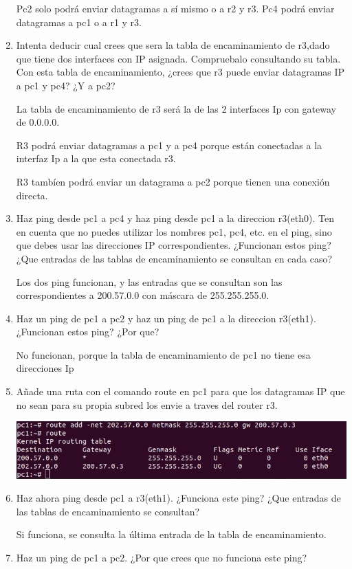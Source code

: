 \documentclass[12pt, a4paper]{report}
\begin{document}
\begin{enumerate}
	Pc2 solo podrá enviar datagramas a sí mismo o a r2 y r3.
	Pc4 podrá enviar datagramas a pc1 o a r1 y r3.

	\item Intenta deducir cual crees que sera la tabla de encaminamiento de r3,dado que tiene dos interfaces con IP asignada. Compruebalo consultando su tabla. Con esta tabla de encaminamiento,  ¿crees que r3 puede enviar datagramas IP a pc1 y pc4? ¿Y a pc2?
	
	La tabla de encaminamiento de r3 será la de las 2 interfaces Ip con gateway de 0.0.0.0.
	
	R3 podrá enviar datagramas a pc1 y a pc4 porque están conectadas a la interfaz Ip a la que esta conectada r3.
	
	R3 tambíen podrá enviar un datagrama a pc2 porque tienen una conexión directa.
	
	\item Haz ping desde pc1 a pc4 y haz ping desde pc1 a la direccion r3(eth0). Ten en cuenta que no puedes utilizar los nombres pc1, pc4, etc. en el ping, sino que debes usar las direcciones IP correspondientes.  ¿Funcionan
	estos ping?  ¿Que entradas de las tablas de encaminamiento se consultan en cada caso?
	
	Los dos ping funcionan, y las entradas que se consultan son las correspondientes a 200.57.0.0 con máscara de 255.255.255.0.
	\item Haz un ping de pc1 a pc2 y haz un  ping de pc1 a la direccion r3(eth1). ¿Funcionan estos ping? ¿Por que?
	
	No funcionan, porque la tabla de encaminamiento de pc1 no tiene esa direcciones Ip
	\item Añade una ruta con el comando route en pc1 para que los datagramas IP que no sean para su propia subred los envie a traves del router r3.
	
	\includegraphics*[width=128mm, scale=0.5, center]{ejercicio3}
	\item Haz ahora ping desde pc1 a r3(eth1).  ¿Funciona este ping?  ¿Que entradas de las tablas de encaminamiento se consultan?
	
	Si funciona, se consulta la última entrada de la tabla de encaminamiento.
	\item Haz un ping de pc1 a pc2. ¿Por que crees que no funciona este ping?
	

\end{enumerate}
\end{document}
